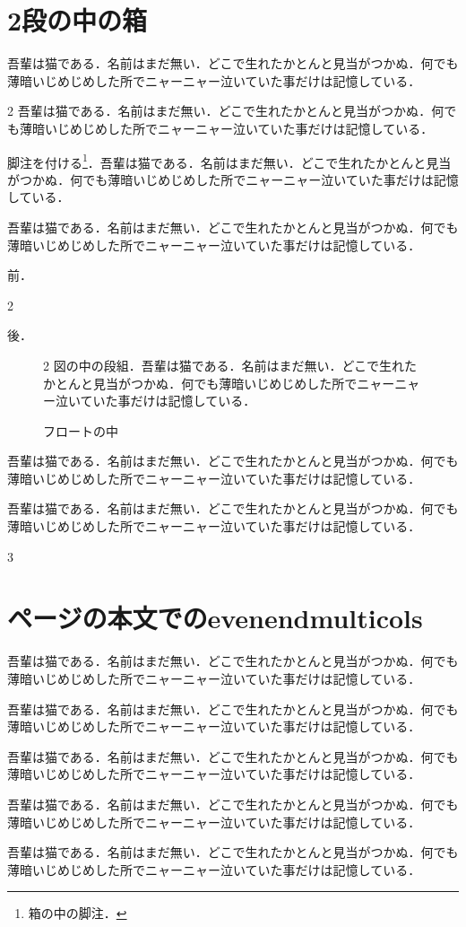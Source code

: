 \documentclass[twocolumn]{jlreq}
\newcommand\para{吾輩は猫である．名前はまだ無い．どこで生れたかとんと見当がつかぬ．何でも薄暗いじめじめした所でニャーニャー泣いていた事だけは記憶している．\par}
\begin{document}
\section{2段の中の箱}
\para
\begin{tcolorbox}[title=段の中の箱で2段]
\begin{multicols}{2}
\para 脚注を付ける\footnote{箱の中の脚注．}．\para
\end{multicols}
\end{tcolorbox}
\para
\begin{tcolorbox}[title=空の環境]
前．
\begin{multicols}{2}
\end{multicols}
後．
\end{tcolorbox}
\begin{figure}[t]
\begin{multicols}{2}
図の中の段組．\para
\end{multicols}
\caption{フロートの中}
\end{figure}
\para\para
\begin{evenendmulticols}[columnsep=1\zw]{3}
\section{ページの本文でのevenendmulticols}
\para\para\para
\end{evenendmulticols}
\para\para
\end{document}
